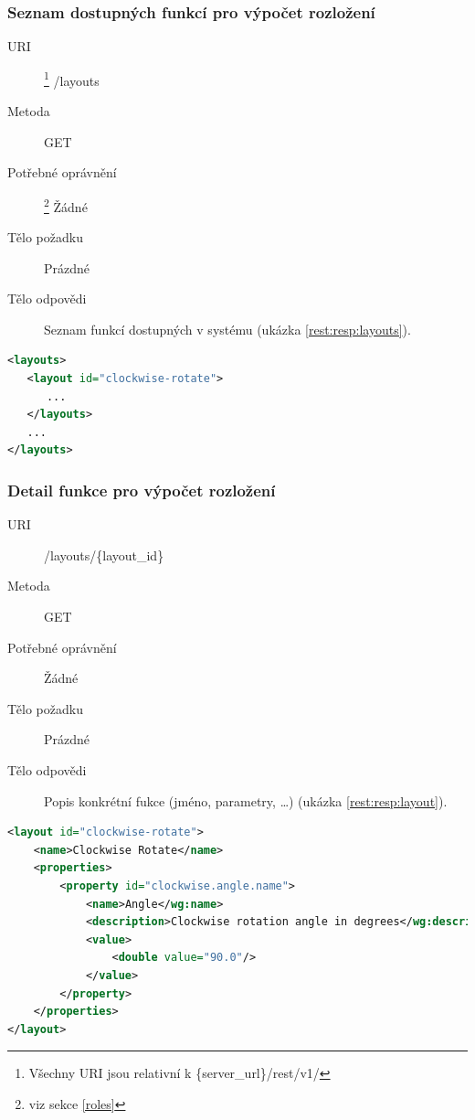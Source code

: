 \documentclass[thesis=M,czech]{FITthesis}[2014/05/6]
\begin{document}
\subsubsection{Seznam dostupných funkcí pro výpočet rozložení}
\begin{description}
  \item[URI]\footnote{Všechny URI jsou relativní k \{server\_url\}/rest/v1/} /layouts
  \item[Metoda] GET
  \item[Potřebné oprávnění]\footnote{viz sekce \ref{roles}} Žádné
  \item[Tělo požadku] Prázdné
  \item[Tělo odpovědi] Seznam  funkcí dostupných v systému (ukázka \ref{rest:resp:layouts}).
\end{description}

\begin{lstlisting}[caption=Tělo odpovědi zdroje /layouts (GET), label=rest:resp:layouts, language=xml]
<layouts>
   <layout id="clockwise-rotate">
      ...
   </layouts>
   ...
</layouts>
\end{lstlisting}  

\subsubsection{Detail funkce pro výpočet rozložení}
\begin{description}
  \item[URI] /layouts/\{layout\_id\}
  \item[Metoda] GET
  \item[Potřebné oprávnění] Žádné
  \item[Tělo požadku] Prázdné
  \item[Tělo odpovědi] Popis konkrétní fukce (jméno, parametry, \ldots) (ukázka \ref{rest:resp:layout}).
\end{description}

\begin{lstlisting}[caption=Tělo odpovědi zdroje /layouts/\{layout\_id\} (GET), label=rest:resp:layout, language=xml]
<layout id="clockwise-rotate">
    <name>Clockwise Rotate</name>
    <properties>
        <property id="clockwise.angle.name">
            <name>Angle</wg:name>
            <description>Clockwise rotation angle in degrees</wg:description>
            <value>
                <double value="90.0"/>
            </value>
        </property>
    </properties>   
</layout>
\end{lstlisting}    
\end{document}
